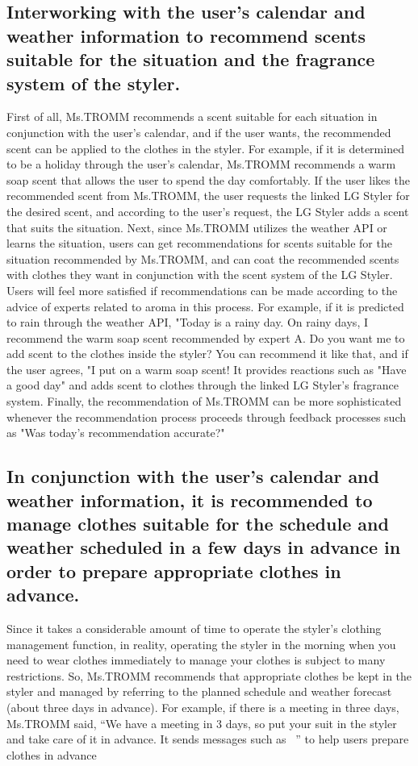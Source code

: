 \documentclass[conference]{IEEEtran}
\begin{document}
\subsection{Interworking with the user’s calendar and weather information to recommend scents suitable for the situation and the fragrance system of the styler.}
First of all, Ms.TROMM recommends a scent suitable for each situation in conjunction with the user's calendar, and if the user wants, the recommended scent can be applied to the clothes in the styler. For example, if it is determined to be a holiday through the user's calendar, Ms.TROMM recommends a warm soap scent that allows the user to spend the day comfortably. If the user likes the recommended scent from Ms.TROMM, the user requests the linked LG Styler for the desired scent, and according to the user's request, the LG Styler adds a scent that suits the situation.
Next, since Ms.TROMM utilizes the weather API or learns the situation, users can get recommendations for scents suitable for the situation recommended by Ms.TROMM, and can coat the recommended scents with clothes they want in conjunction with the scent system of the LG Styler. Users will feel more satisfied if recommendations can be made according to the advice of experts related to aroma in this process. For example, if it is predicted to rain through the weather API, "Today is a rainy day. On rainy days, I recommend the warm soap scent recommended by expert A. Do you want me to add scent to the clothes inside the styler? You can recommend it like that, and if the user agrees, "I put on a warm soap scent! It provides reactions such as "Have a good day" and adds scent to clothes through the linked LG Styler's fragrance system. Finally, the recommendation of Ms.TROMM can be more sophisticated whenever the recommendation process proceeds through feedback processes such as "Was today's recommendation accurate?"\\


\subsection{In conjunction with the user’s calendar and weather information, it is recommended to manage clothes suitable for the schedule and weather scheduled in a few days in advance in order to prepare appropriate clothes in advance.}
Since it takes a considerable amount of time to operate the styler’s clothing management function, in reality, operating the styler in the morning when you need to wear clothes immediately to manage your clothes is subject to many restrictions. So, Ms.TROMM recommends that appropriate clothes be kept in the styler and managed by referring to the planned schedule and weather forecast (about three days in advance). For example, if there is a meeting in three days, Ms.TROMM said, “We have a meeting in 3 days, so put your suit in the styler and take care of it in advance. It sends messages such as ~” to help users prepare clothes in advance\\
\end{document}
